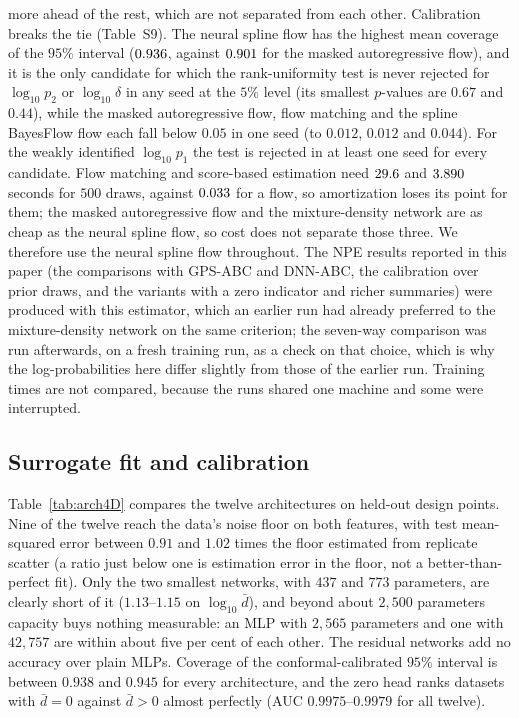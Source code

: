 \documentclass[sn-basic,iicol,pdflatex]{sn-jnl}
\begin{document}
more ahead of the rest, which are not separated from each other. Calibration breaks the tie (Table~S9). The neural spline flow has the highest mean coverage of the $95\%$ interval ($0.936$,
against $0.901$ for the masked autoregressive flow), and it is the only candidate for which the rank-uniformity test is never rejected for $\log_{10}p_2$ or $\log_{10}\delta$ in any seed at the
$5\%$ level (its smallest $p$-values are $0.67$ and $0.44$), while the masked autoregressive flow, flow matching and the spline BayesFlow flow each fall below $0.05$ in one seed (to $0.012$, $0.012$ and $0.044$). For the weakly identified $\log_{10}p_1$ the test is rejected in at least one seed for every candidate. Flow matching and score-based estimation need
$29.6$ and $3.890$ seconds for $500$ draws, against $0.033$ for a flow, so amortization loses its point for them; the
masked autoregressive flow and the mixture-density network are as cheap as the neural spline flow, so cost does not separate those three. We therefore use the neural spline flow
throughout. The NPE results reported in this paper (the comparisons with GPS-ABC and DNN-ABC, the calibration over prior draws, and the variants with a zero indicator and richer summaries)
were produced with this estimator, which an earlier run had already preferred to the mixture-density network on the same criterion; the seven-way comparison was run afterwards, on a
fresh training run, as a check on that choice, which is why the log-probabilities here differ slightly from those of the earlier run. Training times are not compared, because the runs shared one machine and some were interrupted.

\subsection{Surrogate fit and calibration}
\label{sec:sim3D_fit}

Table~\ref{tab:arch4D} compares the twelve architectures on held-out design points.
Nine of the twelve reach the data's noise floor on both features, with test
mean-squared error between $0.91$ and $1.02$ times the floor estimated from replicate scatter
(a ratio just below one is estimation error in the floor, not a better-than-perfect
fit). Only the two smallest networks, with $437$ and $773$ parameters, are clearly short of it
($1.13$--$1.15$ on $\log_{10}\bar d$), and beyond about $2{,}500$ parameters
capacity buys nothing measurable: an MLP with $2{,}565$ parameters and one with
$42{,}757$ are within about five per cent of each other. The residual networks add no accuracy
over plain MLPs. Coverage of the conformal-calibrated $95\%$ interval is between
$0.938$ and $0.945$ for every architecture, and the zero head ranks datasets with
$\bar d=0$ against $\bar d>0$ almost perfectly (AUC $0.9975$--$0.9979$ for all twelve).
\end{document}
